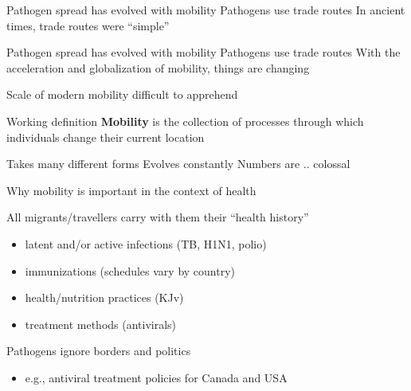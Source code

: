 \documentclass[aspectratio=169]{beamer}\usepackage[]{graphicx}\usepackage[]{xcolor}
\begin{document}
\begin{frame}{Pathogen spread has evolved with mobility}
Pathogens use trade routes 
\vfill 
In ancient times, trade routes were ``simple''
\end{frame}



\begin{frame}{Pathogen spread has evolved with mobility}
Pathogens use trade routes 
\vfill 
With the acceleration and globalization of mobility, things are changing
\end{frame}


\begin{frame}{Scale of modern mobility difficult to apprehend}
\begin{block}{Working definition}
\textbf{Mobility} is the collection of processes through which individuals change their current location
\end{block}
\vfill
Takes many different forms \vfill Evolves constantly \vfill  Numbers are
.. colossal
\end{frame}


\begin{frame}{Why mobility is important in the context of health}

\begin{block}{}
All migrants/travellers carry with them their ``health history''
\end{block}
\begin{itemize}
\item latent and/or active infections (TB, H1N1, polio)
\item immunizations (schedules vary by country)
\item health/nutrition practices (KJv)
\item treatment methods (antivirals)
\end{itemize}
\begin{block}{}
Pathogens ignore borders and politics
\end{block}     
\begin{itemize}
\item e.g., antiviral treatment policies for Canada and USA
\end{itemize}
\end{frame}
	
\end{document}
